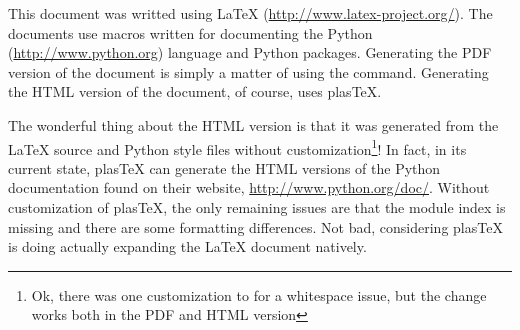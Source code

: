
This document was writted using LaTeX (\url{http://www.latex-project.org/}).  
The documents use macros written for documenting the Python 
(\url{http://www.python.org}) language and Python packages.  Generating
the PDF version of the document is simply a matter of using the 
 command.  Generating the HTML version of the document,
of course, uses plasTeX.  

The wonderful thing about the HTML version is that it was generated from
the LaTeX source and Python style files without customization\footnote{
Ok, there was one customization to  for a whitespace issue,
but the change works both in the PDF and HTML version}!  In fact, in its
current state, plasTeX can generate the HTML versions of the Python
documentation found on their website, \url{http://www.python.org/doc/}.
Without customization of plasTeX, the only remaining issues are that the
module index is missing and there are some formatting differences.
Not bad, considering plasTeX is doing actually expanding the LaTeX
document natively.
